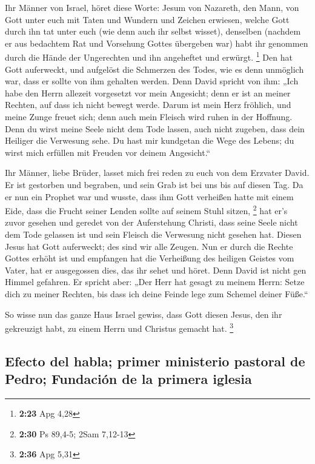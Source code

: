  Ihr Männer von Israel, höret diese Worte: Jesum von
Nazareth, den Mann, von Gott unter euch mit Taten und Wundern und
Zeichen erwiesen, welche Gott durch ihn tat unter euch (wie denn auch
ihr selbst wisset),  denselben (nachdem er aus bedachtem
Rat und Vorsehung Gottes übergeben war) habt ihr genommen durch die
Hände der Ungerechten und ihn angeheftet und erwürgt. \footnote{\textbf{2:23}
  Apg 4,28}  Den hat Gott auferweckt, und aufgelöst die
Schmerzen des Todes, wie es denn unmöglich war, dass er sollte von ihm
gehalten werden.  Denn David spricht von ihm: „Ich habe
den Herrn allezeit vorgesetzt vor mein Angesicht; denn er ist an meiner
Rechten, auf dass ich nicht bewegt werde.  Darum ist mein
Herz fröhlich, und meine Zunge freuet sich; denn auch mein Fleisch wird
ruhen in der Hoffnung.  Denn du wirst meine Seele nicht
dem Tode lassen, auch nicht zugeben, dass dein Heiliger die Verwesung
sehe.  Du hast mir kundgetan die Wege des Lebens; du
wirst mich erfüllen mit Freuden vor deinem Angesicht.``

 Ihr Männer, liebe Brüder, lasset mich frei reden zu euch
von dem Erzvater David. Er ist gestorben und begraben, und sein Grab ist
bei uns bis auf diesen Tag.  Da er nun ein Prophet war
und wusste, dass ihm Gott verheißen hatte mit einem Eide, dass die
Frucht seiner Lenden sollte auf seinem Stuhl sitzen, \footnote{\textbf{2:30}
  Ps 89,4-5; 2Sam 7,12-13}  hat er's zuvor gesehen und
geredet von der Auferstehung Christi, dass seine Seele nicht dem Tode
gelassen ist und sein Fleisch die Verwesung nicht gesehen hat.
 Diesen Jesus hat Gott auferweckt; des sind wir alle
Zeugen.  Nun er durch die Rechte Gottes erhöht ist und
empfangen hat die Verheißung des heiligen Geistes vom Vater, hat er
ausgegossen dies, das ihr sehet und höret.  Denn David
ist nicht gen Himmel gefahren. Er spricht aber: „Der Herr hat gesagt zu
meinem Herrn: Setze dich zu meiner Rechten,  bis dass ich
deine Feinde lege zum Schemel deiner Füße.``

 So wisse nun das ganze Haus Israel gewiss, dass Gott
diesen Jesus, den ihr gekreuzigt habt, zu einem Herrn und Christus
gemacht hat. \footnote{\textbf{2:36} Apg 5,31}

\hypertarget{efecto-del-habla-primer-ministerio-pastoral-de-pedro-fundaciuxf3n-de-la-primera-iglesia}{%
\subsection{Efecto del habla; primer ministerio pastoral de Pedro;
Fundación de la primera
iglesia}\label{efecto-del-habla-primer-ministerio-pastoral-de-pedro-fundaciuxf3n-de-la-primera-iglesia}}

